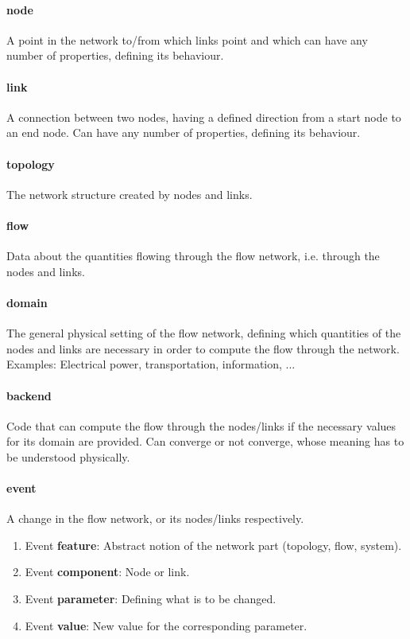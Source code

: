 \documentclass[11pt,fleqn]{book} %
\newcommand{\backend}[1][]{backend#1}
\newcommand{\domain}[1][]{domain#1}
\begin{document}
\paragraph{node}
A point in the network to/from which links point and which can have any number of properties, defining its behaviour.

\paragraph{link}
A connection between two nodes, having a defined direction from a start node to an end node. Can have any number of properties, defining its behaviour.

\paragraph{topology}
The network structure created by nodes and links.

\paragraph{flow}
Data about the quantities flowing through the flow network, i.e. through the nodes and links.

\paragraph{\domain{}}\index{\domain{}}
The general physical setting of the flow network, defining which quantities of the nodes and links are necessary in order to compute the flow through the network. Examples: Electrical power, transportation, information, ...

\paragraph{\backend{}}\index{\backend{}}
Code that can compute the flow through the nodes/links if the necessary values for its \domain{} are provided. Can converge or not converge, whose meaning has to be understood physically.

\paragraph{event}
A change in the flow network, or its nodes/links respectively.
\begin{enumerate}
	\item Event \textbf{feature}: Abstract notion of the network part (topology, flow, system).
	\item Event \textbf{component}: Node or link.
	\item Event \textbf{parameter}: Defining what is to be changed.
	\item Event \textbf{value}: New value for the corresponding parameter.
\end{enumerate}
\end{document}
